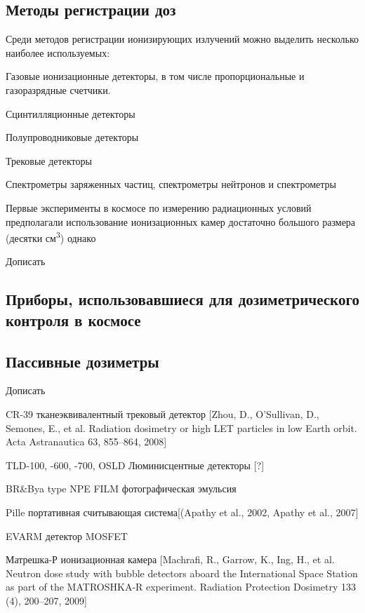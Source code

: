\documentclass[a4paper,portrait,12pt]{article}
\begin{document}
{{{{{\large \newpage
}


\subsection*{	\textbf{Методы регистрации доз}\textbf{ }}

Среди методов регистрации ионизирующих излучений можно выделить несколько наиболее используемых:


Газовые ионизационные детекторы, в том числе пропорциональные и газоразрядные счетчики.


Сцинтилляционные детекторы


Полупроводниковые детекторы 


Трековые детекторы


Спектрометры заряженных частиц, спектрометры нейтронов и спектрометры 


Первые эксперименты в космосе по измерению радиационных условий предполагали использование ионизационных камер достаточно большого размера (десятки см\textsuperscript{3}) однако 


\colorbox[rgb]{1.000,0.000,0.000}{Дописать}


\subsection*{	\textbf{Приборы, использовавшиеся для дозиметрического контроля в космосе}}

\subsection*{	\textbf{Пассивные дозиметры}}




\colorbox[rgb]{1.000,0.000,0.000}{Дописать}


CR-39 тканеэквивалентный трековый детектор [Zhou, D., O'Sullivan, D., Semones, E., et al. Radiation dosimetry or high LET particles in low Earth orbit. Acta Astranautica 63, 855--864, 2008]


TLD-100, -600, -700, OSLD Люминисцентные детекторы [?]


BR\&Bya type NPE FILM фотографическая эмульсия


Pille портативная считывающая система[(Apathy et al., 2002, Apathy et al., 2007]


EVARM детектор MOSFET 


Матрешка-Р ионизационная камера [Machrafi, R., Garrow, K., Ing, H., et al. Neutron dose study with bubble detectors aboard the International Space Station as part of the MATROSHKA-R experiment. Radiation Protection Dosimetry 133 (4), 200--207, 2009]


}}}}
\end{document}
